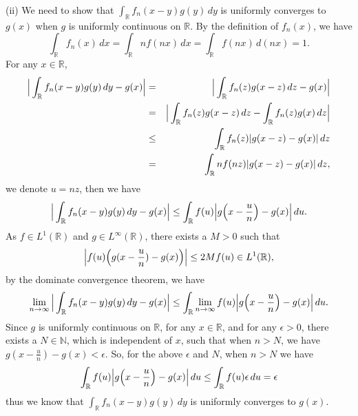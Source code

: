 \documentclass[12pt]{article}
\begin{document}
(ii) We need to show that $\int_{\mathbb{R}}^{} f_{n}(x - y) g(y) \, d y$ is uniformly converges to $g(x)$ when $g$ is uniformly continuous on $\mathbb{R}$. By the definition of $f_{n}(x)$, we have
\begin{equation*}
    \int_{\mathbb{R}}^{} f_{n}(x) \, d x = \int_{\mathbb{R}}^{} n f(n x) \, d x = \int_{\mathbb{R}}^{} f(n x) \, d (n x) = 1.
\end{equation*}
For any $x \in \mathbb{R}$,
\begin{eqnarray*}
    \Big{|} \int_{\mathbb{R}}^{} f_{n}(x - y) g(y) \, d y - g(x) \Big{|} & = &  \Big{|} \int_{\mathbb{R}}^{}  f_{n}(z) g(x - z) \, d z - g(x) \Big{|} \\
    & = & \Big{|} \int_{\mathbb{R}}^{}  f_{n}(z) g(x - z) \, d z - \int_{\mathbb{R}}^{}  f_{n}(z) g(x) \, d z \Big{|} \\
    & \leq &  \int_{\mathbb{R}}^{}  f_{n}(z) | g(x - z) - g(x) | \, d z \\
    & = & \int_{\mathbb{R}}^{} n f(n z) | g(x - z) - g(x) | \, d z,
\end{eqnarray*}
we denote $ u = n z$, then we have
\begin{equation*}
    \Big{|} \int_{\mathbb{R}}^{} f_{n}(x - y) g(y) \, d y - g(x) \Big{|} \leq \int_{\mathbb{R}}^{}  f(u) \Big{|} g \Big{(} x - \frac{u}{n} \Big{)} - g(x) \Big{|} \, d u.
\end{equation*}
As $f \in L^{1}(\mathbb{R})$ and $g \in L^{\infty}(\mathbb{R})$, there exists a $M > 0$ such that
\begin{equation*}
    \Big{|} f(u) \Big{(} g(x - \frac{u}{n}) - g(x)\Big{)} \Big{|} \leq 2M f(u) \in L^{1}(\mathbb{R}),
\end{equation*}
by the dominate convergence theorem, we have
\begin{equation*}
    \lim_{n \to \infty} \Big{|} \int_{\mathbb{R}}^{} f_{n}(x - y) g(y) \, d y - g(x) \Big{|} \leq \int_{\mathbb{R}}^{}  \lim_{n \to \infty} f(u) \Big{|} g \Big{(} x - \frac{u}{n} \Big{)} - g(x) \Big{|} \, d u.
\end{equation*}
Since $g$ is uniformly continuous on $\mathbb{R}$, for any $x \in \mathbb{R}$, and for any $\epsilon > 0$, there exists a $N \in \mathbb{N}$, which is independent of $x$, such that when $n > N$, we have $g ( x - \frac{u}{n} ) - g(x) < \epsilon $. So, for the above $\epsilon$ and $N$, when $n > N$ we have
\begin{equation*}
    \int_{\mathbb{R}}^{} f(u) \Big{|} g \Big{(} x - \frac{u}{n} \Big{)} - g(x) \Big{|} \, d u \leq \int_{\mathbb{R}}^{} f(u) \epsilon \, d u = \epsilon
\end{equation*}
thus we know that $\int_{\mathbb{R}}^{} f_{n}(x - y) g(y) \, d y$ is uniformly converges to $g(x)$.
\end{document}
